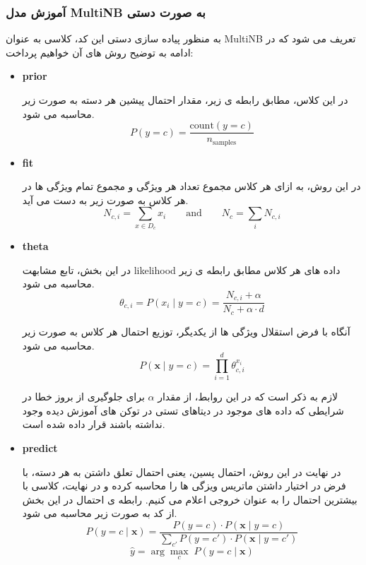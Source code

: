\documentclass{article}
\begin{document}
\subsubsection{آموزش مدل MultiNB به صورت دستی}
به منظور پیاده سازی دستی این کد، کلاسی به عنوان MultiNB تعریف می شود که در ادامه به توضیح روش های آن خواهیم پرداخت:
\begin{itemize}
    \item \textbf{prior} 
    
    در این کلاس، مطابق رابطه ی زیر، مقدار احتمال پیشین هر دسته به صورت زیر محاسبه می شود.
    \begin{equation}
        P(y = c) = \frac{\text{count}(y = c)}{n_{\text{samples}}}
    \end{equation}
    
    \item \textbf{fit}
    
    در این روش، به ازای هر کلاس مجموع تعداد هر ویژگی و مجموع تمام ویژگی ها در هر کلاس به صورت زیر به دست می آید.
    \begin{equation}
        N_{c,i} = \sum_{x \in D_c} x_i \qquad \text{and} \qquad N_c = \sum_i N_{c,i}
    \end{equation}

    \item \textbf{theta}

    در این بخش، تابع مشابهت likelihood داده های هر کلاس مطابق رابطه ی زیر محاسبه می شود.
        \begin{equation}
        \theta_{c,i} = P(x_i \mid y = c) = \frac{N_{c,i} + \alpha}{N_c + \alpha \cdot d}
    \end{equation}

    آنگاه با فرض استقلال ویژگی ها از یکدیگر، توزیع احتمال هر کلاس به صورت زیر محاسبه می شود.
        \begin{equation}
        P(\mathbf{x} \mid y = c) = \prod_{i=1}^{d} \theta_{c,i}^{x_i}
        \end{equation}

    لازم به ذکر است که در این روابط، از مقدار 
    $\alpha$ برای جلوگیری از بروز خطا در شرایطی که داده های موجود در دیتاهای تستی در توکن های آموزش دیده وجود نداشته باشند قرار داده شده است.

    \item \textbf{predict}

    در نهایت در این روش، احتمال پسین، یعنی احتمال تعلق داشتن به هر دسته، با فرض در اختیار داشتن ماتریس ویزگی ها را محاسبه کرده و در نهایت، کلاسی با بیشترین احتمال را به عنوان خروجی اعلام می کنیم. رابطه ی احتمال در این بخش از کد به صورت زیر محاسبه می شود.
    \begin{equation}
        P(y = c \mid \mathbf{x}) = \frac{P(y = c) \cdot P(\mathbf{x} \mid y = c)}{\sum_{c'} P(y = c') \cdot P(\mathbf{x} \mid y = c')}
    \end{equation}
    \begin{equation}
        \hat{y} = \arg\max_c \; P(y = c \mid \mathbf{x})
    \end{equation}
\end{itemize}
\end{document}
